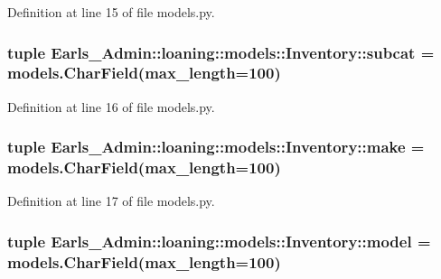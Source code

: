Definition at line 15 of file models.py.\hypertarget{classEarls__Admin_1_1loaning_1_1models_1_1Inventory_d542515e0ee025b7e321621e92b3f41c}{
\subsubsection[subcat]{\setlength{\rightskip}{0pt plus 5cm}tuple {\bf Earls\_\-Admin::loaning::models::Inventory::subcat} = models.CharField(max\_\-length=100)}}
\label{classEarls__Admin_1_1loaning_1_1models_1_1Inventory_d542515e0ee025b7e321621e92b3f41c}




Definition at line 16 of file models.py.\hypertarget{classEarls__Admin_1_1loaning_1_1models_1_1Inventory_6a5335b94805e8cf14904e5c4ec19363}{
\subsubsection[make]{\setlength{\rightskip}{0pt plus 5cm}tuple {\bf Earls\_\-Admin::loaning::models::Inventory::make} = models.CharField(max\_\-length=100)}}
\label{classEarls__Admin_1_1loaning_1_1models_1_1Inventory_6a5335b94805e8cf14904e5c4ec19363}




Definition at line 17 of file models.py.\hypertarget{classEarls__Admin_1_1loaning_1_1models_1_1Inventory_3d794aabeac9497fec46f59dd4d8bb9c}{
\subsubsection[model]{\setlength{\rightskip}{0pt plus 5cm}tuple {\bf Earls\_\-Admin::loaning::models::Inventory::model} = models.CharField(max\_\-length=100)}}
\label{classEarls__Admin_1_1loaning_1_1models_1_1Inventory_3d794aabeac9497fec46f59dd4d8bb9c}




